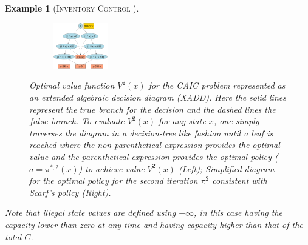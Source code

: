 \documentclass[twoside,11pt]{article}
\newcommand{\true}{\mathit{true}}
\newcommand{\false}{\mathit{false}}
\newcommand{\InventoryControl}{\textsc{Inventory Control }}
\newtheorem*{example*}{Example}
\begin{document}
\begin{example*} [\InventoryControl]
\begin{figure}[t!]
\begin{subfigure}
        \end{subfigure}
                \hspace{2mm}
\begin{subfigure}
                \centering
                \includegraphics[width=0.26\textwidth]{pics/inv-p2.pdf}
        \end{subfigure}
\vspace{-2mm}
\caption{\footnotesize Optimal value function $V^2(x)$ for the
CAIC problem represented as an extended algebraic decision
diagram (XADD).  Here the solid lines represent the $\true$ branch for
the decision and the dashed lines the $\false$ branch.  To evaluate
$V^2(x)$ for any state $x$, one simply traverses the diagram in a
decision-tree like fashion until a leaf is reached where the
non-parenthetical expression provides the \emph{optimal value} and the
parenthetical expression provides the \emph{optimal policy} 
($a = \pi^{*,2}(x)$) to achieve value $V^2(x)$ (Left); Simplified diagram for the optimal policy for the second iteration $\pi^2$ consistent with Scarf's policy (Right).}
\label{fig:inv_policy}
\vspace{-6mm}
\end{figure}
Note that illegal state values are defined using $-\infty$, in this case having the capacity lower than zero at any time and having capacity higher than that of the total $C$. 
\end{example*}
\end{document}
